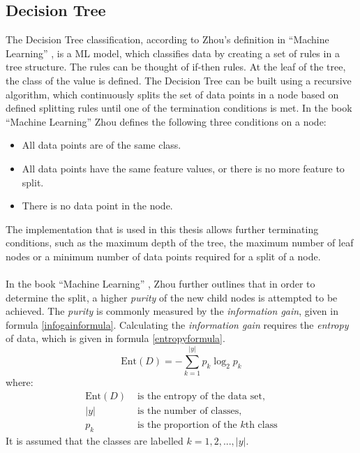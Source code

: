 \subsection{Decision Tree}
The Decision Tree classification, according to Zhou's definition in “Machine Learning” \parencite{zhou2021machine}, is a \ac{ML} model, which classifies data by creating a set of rules in a tree structure. The rules can be thought of if-then rules. At the leaf of the tree, the class of the value is defined. The Decision Tree can be built using a recursive algorithm, which continuously splits the set of data points in a node based on defined splitting rules until one of the termination conditions is met. In the book “Machine Learning” \parencite{zhou2021machine} Zhou defines the following three conditions on a node:
\begin{itemize}
  \item All data points are of the same class. 
  \item All data points have the same feature values, or there is no more feature to split. 
  \item There is no data point in the node.
\end{itemize}
The implementation that is used in this thesis \parencite{sklearnt33:online} allows further terminating conditions, such as the maximum depth of the tree, the maximum number of leaf nodes or a minimum number of data points required for a split of a node. 
\\\\
In the book “Machine Learning” \parencite{zhou2021machine}, Zhou further outlines that in order to determine the split, a higher \textit{purity} of the new child nodes is attempted to be achieved. The \textit{purity} is commonly measured by the \textit{information gain}, given in formula \ref{infogainformula}. Calculating the \textit{information gain} requires the \textit{entropy} of data, which is given in formula \ref{entropyformula}.  
\begin{equation} \label{entropyformula}
 \text{Ent}(D) = -\sum_{k=1}^{|y|} p_k \log_{2} p_k 
\end{equation}
where: 
\begin{align*}
\text{Ent}(D) & \text{ is the entropy of the data set}, \\
|y| & \text{ is the number of classes}, \\
p_k & \text{ is the proportion of the } k \text{th class}
\end{align*}
It is assumed that the classes are labelled $k=1,2,...,|y|$.
